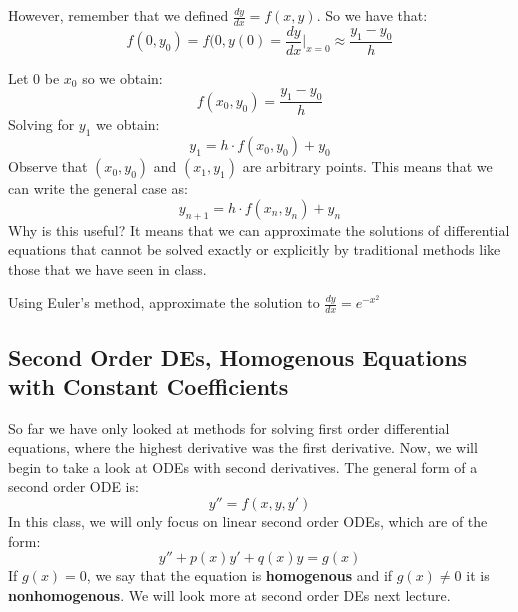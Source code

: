 However, remember that we defined $\frac{dy}{dx} = f(x,y)$. So we have that:
\[ f(0, y_0) = f(0, y(0) = \frac{dy}{dx}\bigg|_{x = 0} \approx \frac{y_1 - y_0}{h} \]

Let $0$ be $x_0$ so we obtain:
\[ f(x_0, y_0) = \frac{y_1 - y_0}{h} \]
Solving for $y_1$ we obtain:
\[ y_1 = h \cdot f(x_0, y_0) + y_0 \]
Observe that $(x_0, y_0)$ and $(x_1, y_1)$ are arbitrary points. This means that we can write the general case as:
\[ y_{n+1} = h \cdot f(x_n, y_n) + y_n \]
Why is this useful? It means that we can approximate the solutions of differential equations that cannot be solved exactly or explicitly by traditional methods like those that we have seen in class. 

\begin{example}
   Using Euler's method, approximate the solution to $\frac{dy}{dx} = e^{-x^2}$
\end{example}

\subsection{Second Order DEs, Homogenous Equations with Constant Coefficients}

So far we have only looked at methods for solving first order differential equations, where the highest derivative was the first derivative. Now, we will begin to take a look at ODEs with second derivatives. The general form of a second order ODE is:
\[ y'' = f(x,y,y') \] 
In this class, we will only focus on linear second order ODEs, which are of the form:
\[ y'' + p(x)y' + q(x)y = g(x) \]
If $g(x) = 0$, we say that the equation is \textbf{homogenous} and if $g(x) \neq 0$ it is \textbf{nonhomogenous}. We will look more at second order DEs next lecture.

